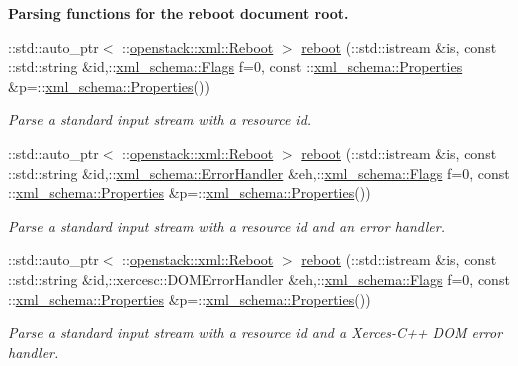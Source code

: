 \begin{Indent}{\bf Parsing functions for the reboot document root.}
\begin{DoxyCompactItemize}
::std::auto\_\-ptr$<$ ::\hyperlink{classopenstack_1_1xml_1_1Reboot}{openstack::xml::Reboot} $>$ \hyperlink{namespaceopenstack_1_1xml_a81d2a6538311197e3f9c6d3f593c2584}{reboot} (::std::istream \&is, const ::std::string \&id,::\hyperlink{namespacexml__schema_affb4c227cbd9aa7453dd1dc5a1401943}{xml\_\-schema::Flags} f=0, const ::\hyperlink{namespacexml__schema_ad27ce19a7ee1d3b1064092648898f64c}{xml\_\-schema::Properties} \&p=::\hyperlink{namespacexml__schema_ad27ce19a7ee1d3b1064092648898f64c}{xml\_\-schema::Properties}())
\begin{DoxyCompactList}\small\item\em Parse a standard input stream with a resource id. \item\end{DoxyCompactList}\item 
::std::auto\_\-ptr$<$ ::\hyperlink{classopenstack_1_1xml_1_1Reboot}{openstack::xml::Reboot} $>$ \hyperlink{namespaceopenstack_1_1xml_a74202597d680d5bbb568117cd5875343}{reboot} (::std::istream \&is, const ::std::string \&id,::\hyperlink{namespacexml__schema_ab1c9361bfd3b404eaabf0c31eded79dc}{xml\_\-schema::ErrorHandler} \&eh,::\hyperlink{namespacexml__schema_affb4c227cbd9aa7453dd1dc5a1401943}{xml\_\-schema::Flags} f=0, const ::\hyperlink{namespacexml__schema_ad27ce19a7ee1d3b1064092648898f64c}{xml\_\-schema::Properties} \&p=::\hyperlink{namespacexml__schema_ad27ce19a7ee1d3b1064092648898f64c}{xml\_\-schema::Properties}())
\begin{DoxyCompactList}\small\item\em Parse a standard input stream with a resource id and an error handler. \item\end{DoxyCompactList}\item 
::std::auto\_\-ptr$<$ ::\hyperlink{classopenstack_1_1xml_1_1Reboot}{openstack::xml::Reboot} $>$ \hyperlink{namespaceopenstack_1_1xml_a4676fe4f0790eddd4b7f8ad9f6bce8a7}{reboot} (::std::istream \&is, const ::std::string \&id,::xercesc::DOMErrorHandler \&eh,::\hyperlink{namespacexml__schema_affb4c227cbd9aa7453dd1dc5a1401943}{xml\_\-schema::Flags} f=0, const ::\hyperlink{namespacexml__schema_ad27ce19a7ee1d3b1064092648898f64c}{xml\_\-schema::Properties} \&p=::\hyperlink{namespacexml__schema_ad27ce19a7ee1d3b1064092648898f64c}{xml\_\-schema::Properties}())
\begin{DoxyCompactList}\small\item\em Parse a standard input stream with a resource id and a Xerces-\/C++ DOM error handler. \item\end{DoxyCompactList}\item 

\end{DoxyCompactItemize}
\end{Indent}
